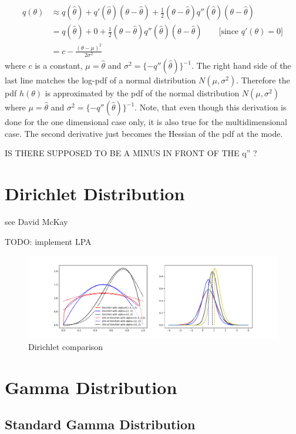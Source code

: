 \documentclass{article}
\begin{document}
\begin{align}
	q(\theta) &\approx q(\hat{\theta}) + q'(\hat{\theta})(\theta - \hat{\theta}) + \frac{1}{2}(\theta- \hat{\theta})q''(\hat{\theta}) (\theta - \hat{\theta})\\
	&= 	q(\hat{\theta}) + 0 +  \frac{1}{2}(\theta- \hat{\theta})q''(\hat{\theta}) (\theta - \hat{\theta}) \qquad \text{[since } q'(\theta) = 0]\\
	&= c - \frac{(\theta - \mu)^2}{2\sigma^2}
\end{align}
where $c$ is a constant, $\mu = \hat{\theta}$ and $\sigma^2 = \{-q''(\hat{\theta})\}^{-1}$. The right hand side of the last line matches the log-pdf of a normal distribution $N(\mu, \sigma^2)$. Therefore the pdf $h(\theta)$ is approximated by the pdf of the normal distribution $N(\mu, \sigma^2)$ where $\mu = \hat{\theta}$ and $\sigma^2 = \{-q''(\hat{\theta})\}^{-1}$. Note, that even though this derivation is done for the one dimensional case only, it is also true for the multidimensional case. The second derivative just becomes the Hessian of the pdf at the mode.

IS THERE SUPPOSED TO BE A MINUS IN FRONT OF THE q'' ?

\section{Dirichlet Distribution}

see David McKay

TODO: implement LPA

\begin{figure}[!htb]
	\centering
	\includegraphics[width=\textwidth]{dirichlet_playground.pdf}
	\caption{Dirichlet comparison}
	\label{fig:Dirichlet_comparison}
\end{figure}

\section{Gamma Distribution}

\subsection{Standard Gamma Distribution}
\end{document}
